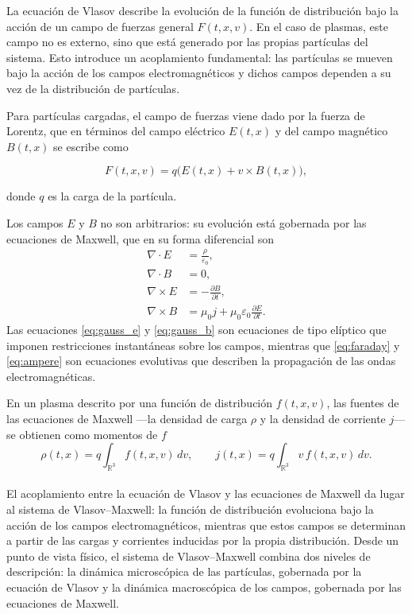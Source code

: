 \documentclass[11pt,a4paper,twoside,pdf]{article}
\numberwithin{equation}{section}
\begin{document}
La ecuación de Vlasov describe la evolución de la función de distribución bajo la
acción de un campo de fuerzas general $F(t,x,v)$. En el caso de plasmas, este campo
no es externo, sino que está generado por las propias partículas del
sistema. Esto introduce un acoplamiento fundamental: las partículas se mueven bajo
la acción de los campos electromagnéticos y dichos campos dependen a su vez de
la distribución de partículas.

Para partículas cargadas, el campo de fuerzas viene dado por la fuerza de Lorentz,
que en términos del campo eléctrico $E(t,x)$ y del campo magnético $B(t,x)$ se
escribe como \cite{martin2021campo}


\[
F(t,x,v) = q\big(E(t,x) + v \times B(t,x)\big),
\]


donde $q$ es la carga de la partícula. 



Los campos $E$ y $B$ no son arbitrarios: su evolución está gobernada por las
ecuaciones de Maxwell, que en su forma diferencial son
\begin{align}
\nabla \cdot E &= \frac{\rho}{\varepsilon_0}, \label{eq:gauss_e}\\
\nabla \cdot B &= 0, \label{eq:gauss_b}\\
\nabla \times E &= -\frac{\partial B}{\partial t}, \label{eq:faraday}\\
\nabla \times B &= \mu_0 j + \mu_0 \varepsilon_0 \frac{\partial E}{\partial t}. \label{eq:ampere}
\end{align}
Las ecuaciones \eqref{eq:gauss_e} y \eqref{eq:gauss_b} son ecuaciones de tipo
elíptico que imponen restricciones instantáneas sobre los campos, mientras que
\eqref{eq:faraday} y \eqref{eq:ampere} son ecuaciones evolutivas que describen la
propagación de las ondas electromagnéticas.


En un plasma descrito por una función de distribución $f(t,x,v)$, las fuentes de las
ecuaciones de Maxwell —la densidad de carga $\rho$ y la densidad de corriente $j$—
se obtienen como momentos de $f$
\begin{equation}
\rho(t,x) = q \int_{\mathbb{R}^3} f(t,x,v)\,dv, 
\qquad
j(t,x) = q \int_{\mathbb{R}^3} v\, f(t,x,v)\,dv.
\label{eq:rho_J}
\end{equation}
\\


\newpage
El acoplamiento entre la ecuación de Vlasov y las ecuaciones de Maxwell da lugar al
sistema de Vlasov–Maxwell: la función de distribución evoluciona bajo la acción de los campos
electromagnéticos, mientras que estos campos se determinan a partir de las cargas y
corrientes inducidas por la propia distribución. Desde un punto de vista físico, el sistema de Vlasov–Maxwell combina dos niveles de
descripción: la dinámica microscópica de las partículas, gobernada por la ecuación de Vlasov y la dinámica macroscópica de los campos, gobernada por las ecuaciones de Maxwell.\newline
\end{document}
